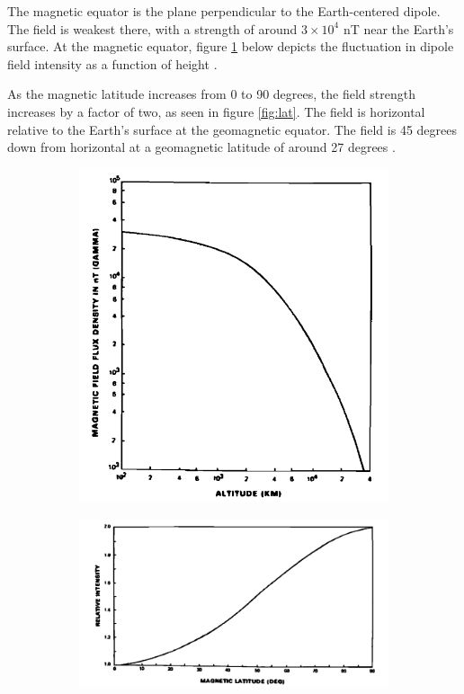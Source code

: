 The magnetic equator is the plane perpendicular to the Earth-centered dipole. The field is weakest there, with a strength of around $3\times10^4$ nT near the Earth's surface. At the magnetic equator, figure \ref{fig:alt} below depicts the fluctuation in dipole field intensity as a function of height \cite{wertz2012spacecraft}.

As the magnetic latitude increases from 0 to 90 degrees, the field strength increases by a factor of two, as seen in figure \ref{fig:lat}. The field is horizontal relative to the Earth's surface at the geomagnetic equator. The field is 45 degrees down from horizontal at a geomagnetic latitude of around 27 degrees \cite{wertz2012spacecraft}.

\begin{figure}[H]
     \centering
     \begin{subfigure}[b]{0.45\textwidth}
         \centering
          \includegraphics[width =\textwidth]{Figures/alt.png}   
               \label{fig:alt}
          \end{subfigure}
     \hfill
     \begin{subfigure}[b]{0.48\textwidth}
         \centering
         \includegraphics[width=\textwidth, angle = 90]{Figures/lat.png}

\end{subfigure}
\end{figure}
